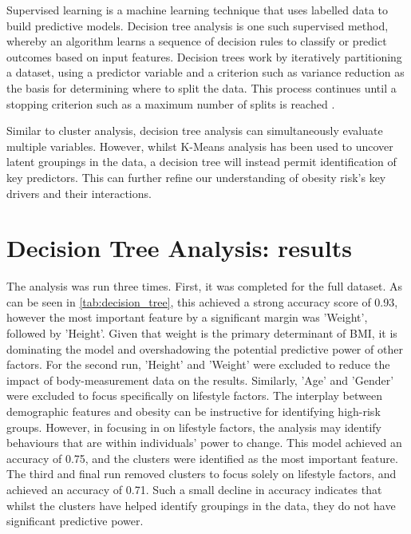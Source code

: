 Supervised learning is a machine learning technique that uses labelled data to build predictive models. Decision tree analysis is one such supervised method, whereby an algorithm learns a sequence of decision rules to classify or predict outcomes based on input features. Decision trees work by iteratively partitioning a dataset, using a predictor variable and a criterion such as variance reduction as the basis for determining where to split the data. This process continues until a stopping criterion such as a maximum number of splits is reached \cite{Geron2022}. 

Similar to cluster analysis, decision tree analysis can simultaneously evaluate multiple variables. However, whilst K-Means analysis has been used to uncover latent groupings in the data, a decision tree will instead permit identification of key predictors. This can further refine our understanding of obesity risk's key drivers and their interactions.

\section{Decision Tree Analysis: results}

The analysis was run three times. First, it was completed for the full dataset. As can be seen in \ref{tab:decision_tree}, this achieved a strong accuracy score of 0.93, however the most important feature by a significant margin was 'Weight', followed by 'Height'. Given that weight is the primary determinant of BMI, it is dominating the model and overshadowing the potential predictive power of other factors. For the second run, 'Height' and 'Weight' were excluded to reduce the impact of body-measurement data on the results. Similarly, 'Age' and 'Gender' were excluded to focus specifically on lifestyle factors. The interplay between demographic features and obesity can be instructive for identifying high-risk groups. However, in focusing in on lifestyle factors, the analysis may identify behaviours that are within individuals' power to change. This model achieved an accuracy of 0.75, and the clusters were identified as the most important feature. The third and final run removed clusters to focus solely on lifestyle factors, and achieved an accuracy of 0.71. Such a small decline in accuracy indicates that whilst the clusters have helped identify groupings in the data, they do not have significant predictive power.

